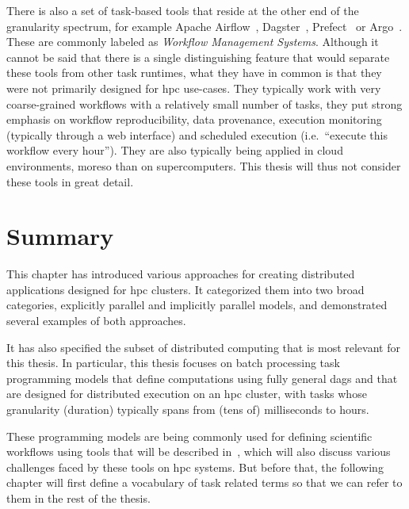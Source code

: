 There is also a set of task-based tools that reside at the other end of the granularity spectrum,
for example Apache Airflow~\cite{airfow}, Dagster~\cite{dagster},
Prefect~\cite{prefect} or Argo~\cite{argo}. These are commonly labeled as
\emph{Workflow Management Systems}. Although it cannot be said that there is a single distinguishing feature
that would separate these tools from other task runtimes, what they have in common is that they
were not primarily designed for \gls{hpc} use-cases. They typically
work with very coarse-grained workflows with a relatively
small number of tasks, they put strong emphasis on workflow reproducibility, data provenance,
execution monitoring (typically through a web interface) and scheduled execution (i.e.\
``execute this workflow every hour''). They are also typically being applied in cloud environments,
moreso than on supercomputers. This thesis will thus not consider these tools in great detail.

\section*{Summary}
This chapter has introduced various approaches for creating distributed applications designed for
\gls{hpc} clusters. It categorized them into two broad categories, explicitly
parallel and implicitly parallel models, and demonstrated several examples of both approaches.

It has also specified the subset of distributed computing that is most relevant for this thesis. In
particular, this thesis focuses on batch processing task programming models that define
computations using fully general \glspl{dag} and that are designed for distributed
execution on an \gls{hpc} cluster, with tasks whose granularity (duration) typically
spans from (tens of) milliseconds to hours.

These programming models are being commonly used for defining scientific workflows using tools that
will be described in~\Autoref{ch:sota}, which will also discuss various challenges faced by
these tools on \gls{hpc} systems. But before that, the following chapter will first
define a vocabulary of task related terms so that we can refer to them in the rest of the thesis.
